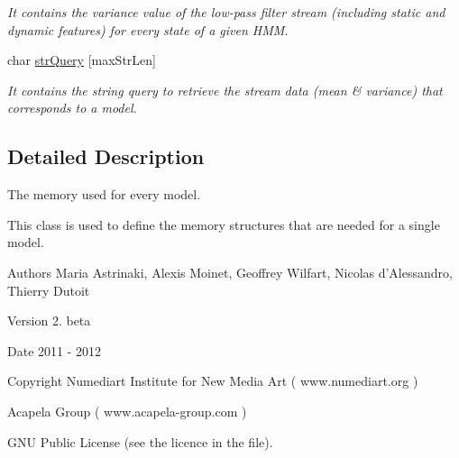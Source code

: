 \begin{DoxyCompactItemize}
\begin{DoxyCompactList}\small\item\em It contains the variance value of the low-\/pass filter stream (including static and dynamic features) for every state of a given H\-M\-M. \end{DoxyCompactList}\item 
\hypertarget{class_m_a_g_e_1_1_model_memory_a45b6edc35e435af4cd50b7dd1850575b}{char \hyperlink{class_m_a_g_e_1_1_model_memory_a45b6edc35e435af4cd50b7dd1850575b}{str\-Query} \mbox{[}max\-Str\-Len\mbox{]}}\label{class_m_a_g_e_1_1_model_memory_a45b6edc35e435af4cd50b7dd1850575b}

\begin{DoxyCompactList}\small\item\em It contains the string query to retrieve the stream data (mean \& variance) that corresponds to a model. \end{DoxyCompactList}\end{DoxyCompactItemize}


\subsection{Detailed Description}
The memory used for every model. 

This class is used to define the memory structures that are needed for a single model.

\begin{DoxyAuthor}{Authors}
Maria Astrinaki, Alexis Moinet, Geoffrey Wilfart, Nicolas d'Alessandro, Thierry Dutoit
\end{DoxyAuthor}
\begin{DoxyVersion}{Version}
2. beta 
\end{DoxyVersion}
\begin{DoxyDate}{Date}
2011 -\/ 2012 
\end{DoxyDate}
\begin{DoxyCopyright}{Copyright}
Numediart Institute for New Media Art ( www.\-numediart.\-org ) \par
 Acapela Group ( www.\-acapela-\/group.\-com ) \par
 G\-N\-U Public License (see the licence in the file). 
\end{DoxyCopyright}


